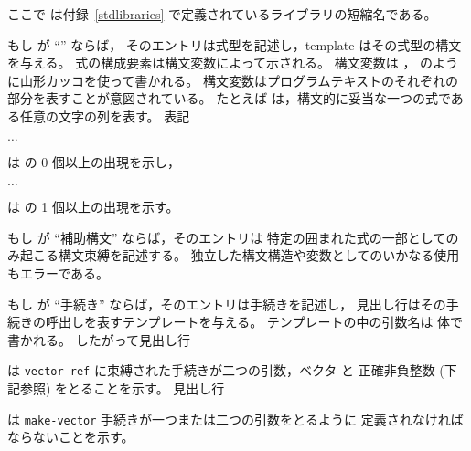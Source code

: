 ここで  は付録~\ref{stdlibraries} で定義されているライブラリの短縮名である。

もし  が ``\exprtype'' ならば，
そのエントリは式型を記述し，template はその式型の構文を与える。
式の構成要素は構文変数によって示される。
構文変数は ， のように山形カッコを使って書かれる。
構文変数はプログラムテキストのそれぞれの部分を表すことが意図されている。
たとえば  は，構文的に妥当な一つの式である任意の文字の列を表す。
表記
\begin{tabbing}
\qquad {} $\ldots$
\end{tabbing}
は  の 0 個以上の出現を示し，
\begin{tabbing}
\qquad {}  $\ldots$
\end{tabbing}
は  の 1 個以上の出現を示す。

もし  が ``補助構文'' ならば，そのエントリは
特定の囲まれた式の一部としてのみ起こる構文束縛を記述する。
独立した構文構造や変数としてのいかなる使用もエラーである。

もし  が ``手続き'' ならば，そのエントリは手続きを記述し，
見出し行はその手続きの呼出しを表すテンプレートを与える。
テンプレートの中の引数名は  体で書かれる。
したがって見出し行

\noindent{}\unpenalty

は {\tt vector-ref} に束縛された手続きが二つの引数，ベクタ  と
正確非負整数  (下記参照) をとることを示す。
見出し行

\noindent%
\unpenalty

は {\tt make-vector} 手続きが一つまたは二つの引数をとるように
定義されなければならないことを示す。

